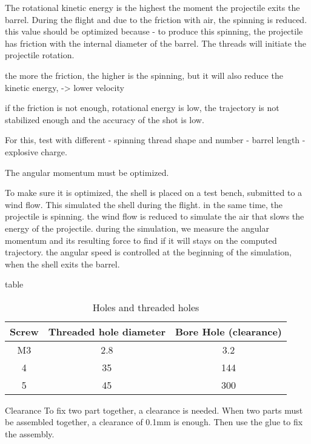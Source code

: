 \documentclass[12pt,a4paper]{article}
\begin{document}
The rotational kinetic energy is the highest the moment the projectile exits the barrel. During the flight and due to the friction with air, the spinning is reduced.
this value should be optimized because
- to produce this spinning, the projectile has friction with the internal diameter of the barrel. The threads will initiate the projectile rotation. 

the more the friction, the higher is the spinning, but it will also reduce the kinetic energy, -> lower velocity

if the friction is not enough, rotational energy is low, the trajectory is not stabilized enough and the accuracy of the shot is low. 

For this, test with different 
- spinning thread shape and number
- barrel length
- explosive charge. 

The angular momentum must be optimized.

To make sure it is optimized, the shell is placed on a test bench, submitted to a wind flow. This simulated the shell during the flight. in the same time, the projectile is spinning. 
the wind flow is reduced to simulate the air that slows the energy of the projectile. during the simulation, we measure the angular momentum and its resulting force to find if it will stays on the computed trajectory. 
the angular speed is controlled at the beginning of the simulation, when the shell exits the barrel. 

\newpage

table

\begin{table}[ht]
	\caption{Holes and threaded holes} %
	\centering %
	\begin{tabular}{c c c} %
		\hline\hline %
		Screw & Threaded hole diameter & Bore Hole (clearance) \\ [0.5ex] %
		\hline %
		M3 & 2.8 & 3.2 \\ %
		4 & 35 & 144 \\
		5 & 45 & 300 \\ [1ex] %
		\hline %
	\end{tabular}\label{table:nonlin} %
\end{table}

Clearance
To fix two part together, a clearance is needed.
When two parts must be assembled together, a clearance of 0.1mm is enough. Then use the glue to fix the assembly. 
\end{document}
